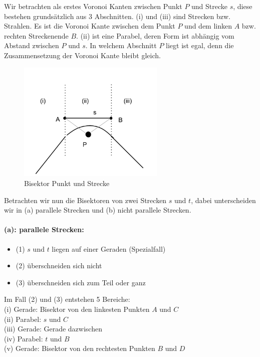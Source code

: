 Wir betrachten als erstes Voronoi Kanten zwischen Punkt $P$ und Strecke $s$, diese bestehen grundsätzlich aus 3 Abschnitten. (i) und (iii) sind Strecken bzw. Strahlen. Es ist die Voronoi Kante zwischen dem Punkt $P$ und dem linken $A$ bzw. rechten Streckenende $B$. (ii) ist eine Parabel, deren Form ist abhängig vom Abstand zwischen $P$ und $s$. In welchem Abschnitt $P$ liegt ist egal, denn die Zusammensetzung der Voronoi Kante bleibt gleich.

\begin{figure}[h]
\begin{center}
\includegraphics[width=7cm]{img/punkt-strecke.png}
\end{center}
\caption{Bisektor Punkt und Strecke}
\label{fig:c1}
\end{figure}

Betrachten wir nun die Bisektoren von zwei Strecken $s$ und $t$, dabei unterscheiden wir in (a) parallele Strecken und (b) nicht parallele Strecken.

\paragraph*{(a): parallele Strecken:}

\begin{itemize}
\item (1) $s$ und $t$ liegen auf einer Geraden (Spezialfall)
\item (2) überschneiden sich nicht
\item (3) überschneiden sich zum Teil oder ganz
\end{itemize}

Im Fall (2) und (3) entstehen 5 Bereiche:\\
(i) Gerade: Bisektor von den linkesten Punkten $A$ und $C$\\
(ii) Parabel: $s$ und $C$\\
(iii) Gerade: Gerade dazwischen\\
(iv) Parabel: $t$ und $B$\\
(v) Gerade: Bisektor von den rechtesten Punkten $B$ und $D$\\


